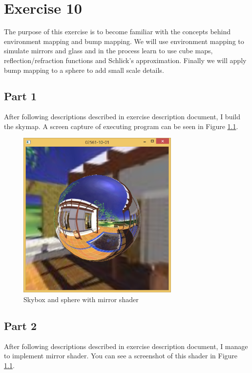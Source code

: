 
\chapter{Exercise 10}
\label{cha:ugeopgave-10}

The purpose of this exercise is to become familiar with the concepts behind environment mapping and bump mapping. We will use environment mapping to simulate mirrors and glass and in the process learn to use cube maps, reflection/refraction functions and Schlick's approximation. Finally we will apply bump mapping to a sphere to add small scale details.

\section{Part 1}
\label{sec:del-1}

After following descriptions described in exercise description document, I build the skymap. A screen capture of executing program can be seen in Figure \ref{fig:10-1}.

\begin{figure}[hp]
\centering
\includegraphics[width=8cm]{../Screenshots/ex-10/1.png}
\caption{Skybox and sphere with mirror shader}
\label{fig:10-1}
\end{figure}

\section{Part 2}
\label{sec:del-2}

After following descriptions described in exercise description document, I manage to implement mirror shader. You can see a screenshot of this shader in Figure \ref{fig:10-1}.

